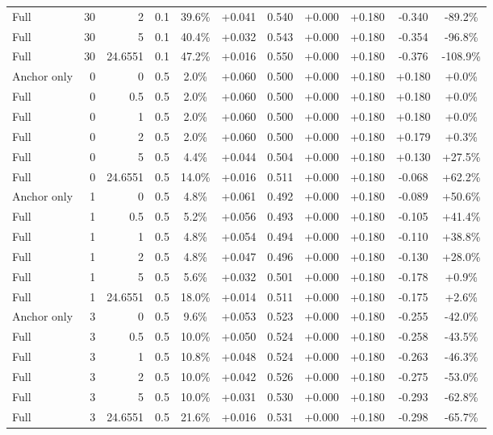 \begin{table}[htbp]
\begin{tabular}{lrrrccccccc}
Full & 30 & 2 & 0.1 & 39.6\% & +0.041 & 0.540 & +0.000 & +0.180 & -0.340 & -89.2\% \\
Full & 30 & 5 & 0.1 & 40.4\% & +0.032 & 0.543 & +0.000 & +0.180 & -0.354 & -96.8\% \\
Full & 30 & 24.6551 & 0.1 & 47.2\% & +0.016 & 0.550 & +0.000 & +0.180 & -0.376 & -108.9\% \\
Anchor only & 0 & 0 & 0.5 & 2.0\% & +0.060 & 0.500 & +0.000 & +0.180 & +0.180 & +0.0\% \\
Full & 0 & 0.5 & 0.5 & 2.0\% & +0.060 & 0.500 & +0.000 & +0.180 & +0.180 & +0.0\% \\
Full & 0 & 1 & 0.5 & 2.0\% & +0.060 & 0.500 & +0.000 & +0.180 & +0.180 & +0.0\% \\
Full & 0 & 2 & 0.5 & 2.0\% & +0.060 & 0.500 & +0.000 & +0.180 & +0.179 & +0.3\% \\
Full & 0 & 5 & 0.5 & 4.4\% & +0.044 & 0.504 & +0.000 & +0.180 & +0.130 & +27.5\% \\
Full & 0 & 24.6551 & 0.5 & 14.0\% & +0.016 & 0.511 & +0.000 & +0.180 & -0.068 & +62.2\% \\
Anchor only & 1 & 0 & 0.5 & 4.8\% & +0.061 & 0.492 & +0.000 & +0.180 & -0.089 & +50.6\% \\
Full & 1 & 0.5 & 0.5 & 5.2\% & +0.056 & 0.493 & +0.000 & +0.180 & -0.105 & +41.4\% \\
Full & 1 & 1 & 0.5 & 4.8\% & +0.054 & 0.494 & +0.000 & +0.180 & -0.110 & +38.8\% \\
Full & 1 & 2 & 0.5 & 4.8\% & +0.047 & 0.496 & +0.000 & +0.180 & -0.130 & +28.0\% \\
Full & 1 & 5 & 0.5 & 5.6\% & +0.032 & 0.501 & +0.000 & +0.180 & -0.178 & +0.9\% \\
Full & 1 & 24.6551 & 0.5 & 18.0\% & +0.014 & 0.511 & +0.000 & +0.180 & -0.175 & +2.6\% \\
Anchor only & 3 & 0 & 0.5 & 9.6\% & +0.053 & 0.523 & +0.000 & +0.180 & -0.255 & -42.0\% \\
Full & 3 & 0.5 & 0.5 & 10.0\% & +0.050 & 0.524 & +0.000 & +0.180 & -0.258 & -43.5\% \\
Full & 3 & 1 & 0.5 & 10.8\% & +0.048 & 0.524 & +0.000 & +0.180 & -0.263 & -46.3\% \\
Full & 3 & 2 & 0.5 & 10.0\% & +0.042 & 0.526 & +0.000 & +0.180 & -0.275 & -53.0\% \\
Full & 3 & 5 & 0.5 & 10.0\% & +0.031 & 0.530 & +0.000 & +0.180 & -0.293 & -62.8\% \\
Full & 3 & 24.6551 & 0.5 & 21.6\% & +0.016 & 0.531 & +0.000 & +0.180 & -0.298 & -65.7\% \\

\end{tabular}
\end{table}

